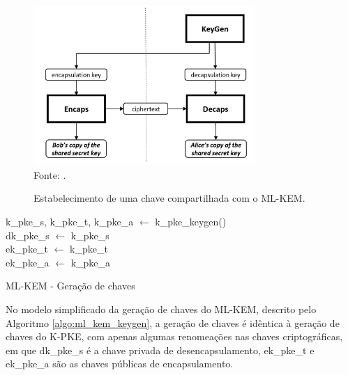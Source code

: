     \begin{figure}[htb!]
        \centering
        \caption{Estabelecimento de uma chave compartilhada com o \ac{ML-KEM}.}
        \includegraphics[width=0.75\textwidth]{Figuras/kem_nist.png}\\
        \footnotesize{Fonte: \cite{kyber}.}
        \label{fig:kem_nist}
    \end{figure}

    \begin{algorithm}[!htbp]
            \SetAlgoLined
            
            k\_pke\_s, k\_pke\_t, k\_pke\_a $\leftarrow$ k\_pke\_keygen()\\
            dk\_pke\_s $\leftarrow$ k\_pke\_s\\
            ek\_pke\_t $\leftarrow$ k\_pke\_t\\
            ek\_pke\_a $\leftarrow$ k\_pke\_a
            
        
            \caption{ML-KEM - Geração de chaves}
            \label{algo:ml_kem_keygen}
        \end{algorithm}

        No modelo simplificado da geração de chaves do \ac{ML-KEM}, descrito pelo Algoritmo \ref{algo:ml_kem_keygen}, a geração de chaves é idêntica à geração de chaves do K-PKE, com apenas algumas renomeações nas chaves criptográficas, em que dk\_pke\_s é a chave privada de desencapsulamento, ek\_pke\_t e ek\_pke\_a são as chaves públicas de encapsulamento.
        
